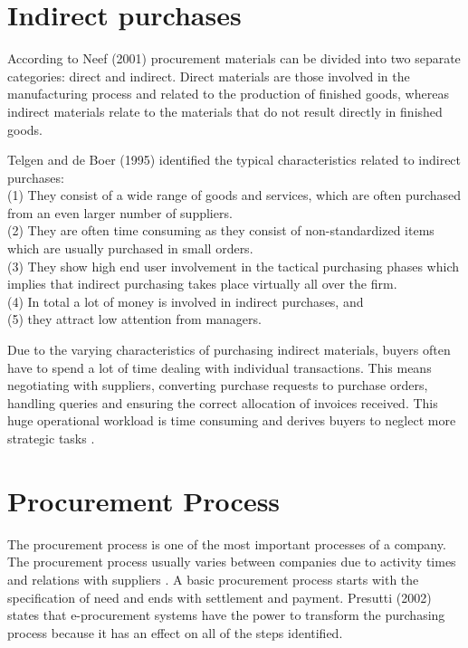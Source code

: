 \section{Indirect purchases}
According to Neef (2001) procurement materials can be divided into two separate categories: direct and indirect. Direct materials are those involved in the manufacturing process and related to the production of finished goods, whereas indirect materials relate to the materials that do not result directly in finished goods.
 

Telgen and de Boer (1995) identified the typical characteristics related to indirect purchases: \\
(1) They consist of a wide range of goods and services, which are often purchased from an even larger number of suppliers.\\
(2) They are often time consuming as they consist of non-standardized items which are usually purchased in small orders.\\
(3) They show high end user involvement in the tactical purchasing phases which implies that indirect purchasing takes place virtually all over the firm.\\
(4) In total a lot of money is involved in indirect purchases, and \\
(5) they attract low attention from managers. 

Due to the varying characteristics of purchasing indirect materials, buyers often have to spend a lot of time dealing with individual transactions. This means negotiating with suppliers, converting purchase requests to purchase orders, handling queries and ensuring the correct allocation of invoices received. This huge operational workload is time consuming and derives buyers to neglect more strategic tasks \citep{pusch2005}. %

\section{Procurement Process }
The procurement process is one of the most important processes of a company. The procurement process usually varies between companies due to activity times and relations with suppliers \citep{trk2010}.
 A basic procurement process starts with the specification of need and ends with settlement and payment. Presutti (2002) states that e-procurement systems have the power to transform the purchasing process because it has an effect on all of the steps identified. 

